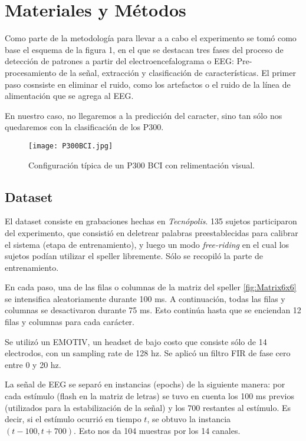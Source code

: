 \section{Materiales y Métodos}

Como parte de la metodología para llevar a a cabo el experimento se tomó como base el esquema de la figura 1, en el que se destacan tres fases del proceso de detección de patrones a partir del electroencefalograma o EEG: Pre-procesamiento de la señal, extracción y clasificación de características. El primer paso cosnsiste en  eliminar el ruido, como los artefactos o el ruido de la línea de alimentación que se agrega al EEG.

En nuestro caso, no llegaremos a la predicción del caracter, sino tan sólo nos quedaremos con la clasificación de los P300.

\begin{figure}[t]
    \centering
    \texttt{[image: P300BCI.jpg]}
    \caption{Configuración típica de un P300 BCI con relimentación visual.}
    \label{fig:P300BCI}
\end{figure}


\subsection{Dataset}

El dataset consiste en grabaciones hechas en \emph{Tecnópolis}. 135 sujetos participaron del experimento, que consistió en deletrear palabras preestablecidas para calibrar el sistema (etapa de entrenamiento), y luego un modo \emph{free-riding} en el cual los sujetos podían utilizar el speller libremente. Sólo se recopiló la parte de entrenamiento.

En cada paso, una de las filas o columnas de la matriz del speller \ref{fig:Matrix6x6} se intensifica aleatoriamente durante 100 ms. A continuación, todas las filas y columnas se desactivaron durante 75 ms. Esto continúa hasta que se enciendan 12 filas y columnas para cada carácter. 

Se utilizó un EMOTIV, un headset de bajo costo que consiste sólo de 14 electrodos, con un sampling rate de 128 hz. Se aplicó un filtro FIR de fase cero entre 0 y 20 hz. 

La señal de EEG se separó en instancias (epochs) de la siguiente manera: por cada estímulo (flash en la matriz de letras) se tuvo en cuenta los 100 ms previos (utilizados para la estabilización de la señal) y los 700 restantes al estímulo. Es decir, si el estímulo ocurrió en tiempo $t$, se obtuvo la instancia $(t-100, t+700)$. Esto nos da 104 muestras por los 14 canales.

